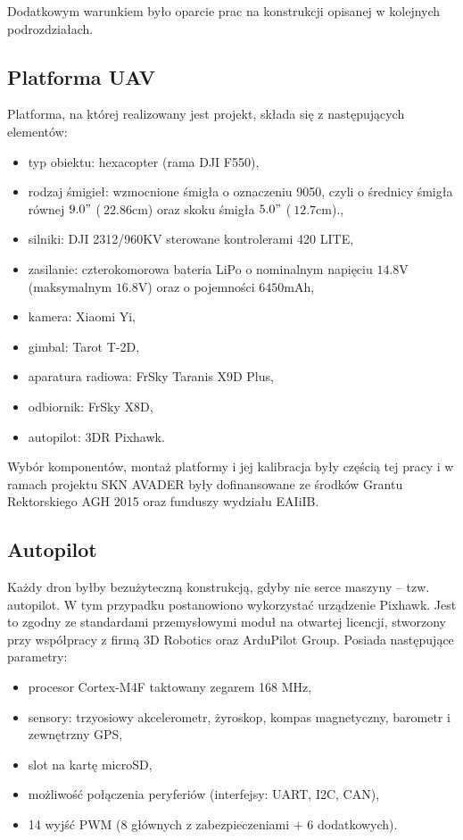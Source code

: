 Dodatkowym warunkiem było oparcie prac na konstrukcji opisanej w kolejnych podrozdziałach.

\subsection{Platforma UAV}
Platforma, na której realizowany jest projekt, składa się z następujących elementów:
\begin{itemize}
	\item typ obiektu: hexacopter (rama DJI F550),
	\item rodzaj śmigieł: wzmocnione śmigła o oznaczeniu 9050, czyli o średnicy śmigła równej $9.0"$ ($~22.86$cm) oraz skoku śmigła $5.0"$ ($~12.7$cm).,
	\item silniki: DJI 2312/960KV sterowane kontrolerami 420 LITE,
	\item zasilanie: czterokomorowa bateria LiPo o nominalnym napięciu $14.8$V (maksymalnym $16.8$V) oraz o pojemności $6450$mAh,
	\item kamera: Xiaomi Yi,
	\item gimbal: Tarot T-2D,
	\item aparatura radiowa: FrSky Taranis X9D Plus,
	\item odbiornik: FrSky X8D,
	\item autopilot: 3DR Pixhawk.
\end{itemize}

Wybór komponentów, montaż platformy i jej kalibracja były częścią tej pracy i w ramach projektu SKN AVADER były dofinansowane ze środków Grantu Rektorskiego AGH 2015 oraz funduszy wydziału EAIiIB.

\subsection{Autopilot}

Każdy dron byłby bezużyteczną konstrukcją, gdyby nie serce maszyny -- tzw. autopilot. 
W tym przypadku postanowiono wykorzystać urządzenie Pixhawk. 
Jest to zgodny ze standardami przemysłowymi moduł na otwartej licencji, stworzony przy współpracy z firmą 3D Robotics oraz ArduPilot Group. 
Posiada następujące parametry:
\begin{itemize}
	\item procesor Cortex-M4F taktowany zegarem 168 MHz,
	\item sensory: trzyosiowy akcelerometr, żyroskop, kompas magnetyczny, barometr i zewnętrzny GPS,
	\item slot na kartę microSD,
	\item możliwość połączenia peryferiów (interfejsy: UART, I2C, CAN),
	\item 14 wyjść PWM (8 głównych z zabezpieczeniami + 6 dodatkowych).
\end{itemize}

